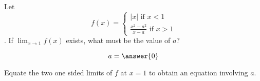 \documentclass{ximera}
\author{Steven Gubkin}
\begin{document}
\begin{exercise}

Let \[f(x) = \begin{cases} \left| x \right| \text{ if $x<1$} \\ \frac{x^2-a^2}{x-a} \text{ if $x>1$}\end{cases}\].  If $\lim_{x \to 1} f(x)$ exists, what must be the value of $a$?

\[a = \answer{0}\]
\begin{hint}
	Equate the two one sided limits of $f$ at $x=1$ to obtain an equation involving $a$.
\end{hint}

\end{exercise}
\end{document}
